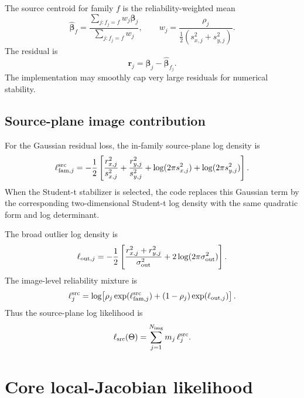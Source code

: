 \documentclass[11pt]{article}
\begin{document}
The source centroid for family $f$ is the reliability-weighted mean
\[
    \widehat{\bm{\beta}}_f
    =
    \frac{
        \sum_{j:f_j=f} w_j \bm{\beta}_j
    }{
        \sum_{j:f_j=f} w_j
    },
    \qquad
    w_j =
    \frac{\rho_j}{\frac{1}{2}(s_{x,j}^2+s_{y,j}^2)}.
\]
The residual is
\[
    \bm{r}_j =
    \bm{\beta}_j - \widehat{\bm{\beta}}_{f_j}.
\]
The implementation may smoothly cap very large residuals for numerical
stability.

\subsection{Source-plane image contribution}

For the Gaussian residual loss, the in-family source-plane log density is
\[
    \ell_{{\rm fam},j}^{\rm src}
    =
    -\frac{1}{2}
    \left[
        \frac{r_{x,j}^2}{s_{x,j}^2}
        +
        \frac{r_{y,j}^2}{s_{y,j}^2}
        +
        \log(2\pi s_{x,j}^2)
        +
        \log(2\pi s_{y,j}^2)
    \right].
\]
When the Student-t stabilizer is selected, the code replaces this Gaussian
term by the corresponding two-dimensional Student-t log density with the same
quadratic form and log determinant.

The broad outlier log density is
\[
    \ell_{{\rm out},j}
    =
    -\frac{1}{2}
    \left[
        \frac{r_{x,j}^2+r_{y,j}^2}{\sigma_{\rm out}^2}
        +
        2\log(2\pi\sigma_{\rm out}^2)
    \right].
\]
The image-level reliability mixture is
\[
    \ell_j^{\rm src}
    =
    \log\!\left[
        \rho_j \exp(\ell_{{\rm fam},j}^{\rm src})
        +
        (1-\rho_j)\exp(\ell_{{\rm out},j})
    \right].
\]
Thus the source-plane log likelihood is
\[
    \ell_{\rm src}(\Theta)
    =
    \sum_{j=1}^{N_{\rm img}}
    m_j\,\ell_j^{\rm src}.
\]

\section{Core local-Jacobian likelihood}
\end{document}
